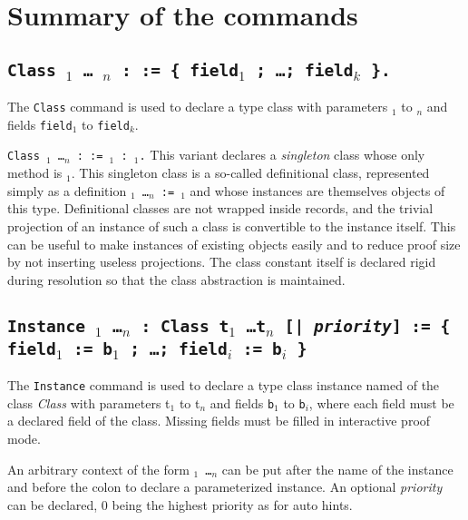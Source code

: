 \section{Summary of the commands
\label{TypeClassCommands}}

\subsection{\tt Class {\ident} {\binder$_1$ \ldots~\binder$_n$} 
  : \sort := \{ field$_1$ ; \ldots ; field$_k$ \}.}
\label{Class}

The \texttt{Class} command is used to declare a type class with
parameters {\binder$_1$} to {\binder$_n$} and fields {\tt field$_1$} to
{\tt field$_k$}.

\begin{Variants}
\item \label{SingletonClass} {\tt Class {\ident} {\binder$_1$ \ldots \binder$_n$} 
    : \sort := \ident$_1$ : \type$_1$.}
  This variant declares a \emph{singleton} class whose only method is
  {\tt \ident$_1$}. This singleton class is a so-called definitional
  class, represented simply as a definition 
  {\tt \ident \binder$_1$ \ldots \binder$_n$ := \type$_1$} and whose
  instances are themselves objects of this type. Definitional classes
  are not wrapped inside records, and the trivial projection of an
  instance of such a class is convertible to the instance itself. This can
  be useful to make instances of existing objects easily and to reduce 
  proof size by not inserting useless projections. The class
  constant itself is declared rigid during resolution so that the class 
  abstraction is maintained.  
\end{Variants}

\subsection{\tt Instance {\ident} {\binder$_1$ \ldots \binder$_n$} :
  {Class} {t$_1$ \ldots t$_n$} [| \textit{priority}]
  := \{ field$_1$ := b$_1$ ; \ldots ; field$_i$ := b$_i$ \}}
\label{Instance}

The \texttt{Instance} command is used to declare a type class instance
named {\ident} of the class \emph{Class} with parameters {t$_1$} to {t$_n$} and
fields {\tt b$_1$} to {\tt b$_i$}, where each field must be a declared
field of the class. Missing fields must be filled in interactive proof mode.

An arbitrary context of the form {\tt \binder$_1$ \ldots \binder$_n$}
can be put after the name of the instance and before the colon to
declare a parameterized instance.
An optional \textit{priority} can be declared, 0 being the highest
priority as for auto hints.

